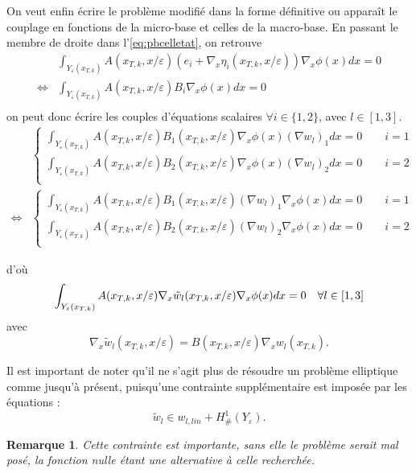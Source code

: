\documentclass[11pt]{article}
\newtheorem{rmq}{Remarque}
\newcommand{\Ye}{Y_\varepsilon}
\newcommand{\tw}{\tilde{w}}
\newcommand{\Hd}{H^1_{\#}}
\newcommand{\xtk}{x_{T,k}}
\begin{document}
On veut enfin écrire le problème modifié dans la forme définitive ou apparaît le couplage en fonctions de la micro-base et celles de la macro-base.
En passant le membre de droite dans l'\autoref{eq:pbcelletat}, on retrouve
\begin{equation}
  \begin{aligned}
    &\int_{\Ye(\xtk)} A(\xtk, x/\varepsilon)(e_i + \nabla_x \eta_i(\xtk, x/\varepsilon)) \nabla_x \phi(x) dx = 0 \\
    \iff &\int_{\Ye(\xtk)} A(\xtk, x/\varepsilon)B_i \nabla_x \phi(x) dx = 0 \\
  \end{aligned}
\end{equation}
on peut donc écrire les couples d'équations scalaires $\forall i\in \{1,2\}$, avec $l\in [1, 3]$.
\begin{equation}
  \begin{aligned}
    &\begin{cases}
      \int_{\Ye(\xtk)} A(\xtk, x/\varepsilon) B_1(\xtk, x/\varepsilon) \nabla_x \phi(x) (\nabla w_l)_1 dx = 0 \qquad i = 1 \\
      \int_{\Ye(\xtk)} A(\xtk, x/\varepsilon) B_2(\xtk, x/\varepsilon) \nabla_x \phi(x) (\nabla w_l)_2 dx = 0 \qquad i = 2 \\ 
    \end{cases}  \\                     
    \iff &\begin{cases}                          
      \int_{\Ye(\xtk)} A(\xtk, x/\varepsilon) B_1(\xtk, x/\varepsilon) (\nabla w_l)_1 \nabla_x \phi(x) dx = 0 \qquad i = 1 \\
      \int_{\Ye(\xtk)} A(\xtk, x/\varepsilon) B_2(\xtk, x/\varepsilon) (\nabla w_l)_2 \nabla_x \phi(x) dx = 0 \qquad i = 2 \\ 
    \end{cases} 
  \end{aligned}
\end{equation}

d'où 
\begin{equation}
  \label{eq:pbcelltw}
  \int_{\Ye(\xtk)} A(\xtk, x/\varepsilon)\nabla_x \tw_l(\xtk, x/\varepsilon) \nabla_x \phi(x) dx = 0 \quad \forall l \in [1, 3]\\
\end{equation}
avec
\[
  \nabla_x \tw_l(\xtk, x/\varepsilon) = B(\xtk, x/\varepsilon) \nabla_x w_l(\xtk).
\]

Il est important de noter qu'il ne s'agit plus de résoudre un problème elliptique comme jusqu'à présent, puisqu'une contrainte supplémentaire est
imposée par les équations :
\[
  \tw_l \in w_{l, lin} + \Hd(\Ye).
\]
\begin{rmq}
  Cette contrainte est importante, sans elle le problème serait mal posé, la fonction nulle étant une alternative à celle recherchée.
\end{rmq}
\end{document}
